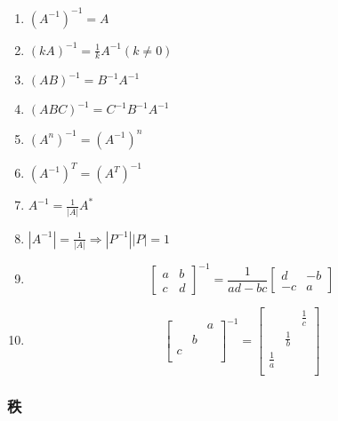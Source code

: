 \documentclass[a4paper,12pt]{article}
\begin{document}
    \begin{enumerate}
        \item $(A^{-1})^{-1} = A$
        \item $(kA)^{-1} = \frac{1}{k}A^{-1}(k \neq 0)$
        \item $(AB)^{-1} = B^{-1}A^{-1}$
        \item $(ABC)^{-1} = C^{-1}B^{-1}A^{-1}$
        \item $(A^n)^{-1} = (A^{-1})^n$
        \item $(A^{-1})^T = (A^T)^{-1}$
        \item $A^{-1} = \frac{1}{|A|}A^{*}$
        \item $|A^{-1}| = \frac{1}{|A|} \Rightarrow |P^{-1}||P| = 1$
        \item
        \[
            \begin{bmatrix}
                a & b \\
                c & d
            \end{bmatrix}^{-1}
            = \frac{1}{ad - bc}\begin{bmatrix}
                                   d  & -b \\
                                   -c & a
            \end{bmatrix}
        \]
        \item
        \[
            \begin{bmatrix}
                &   & a \\
                & b &   \\
                c &   &   \\
            \end{bmatrix}^{-1}
            = \begin{bmatrix}
                  &             & \frac{1}{c} \\
                  & \frac{1}{b} &             \\
                  \frac{1}{a} &             &             \\
            \end{bmatrix}
        \]
    \end{enumerate}

    \subsubsection{秩}
\end{document}
